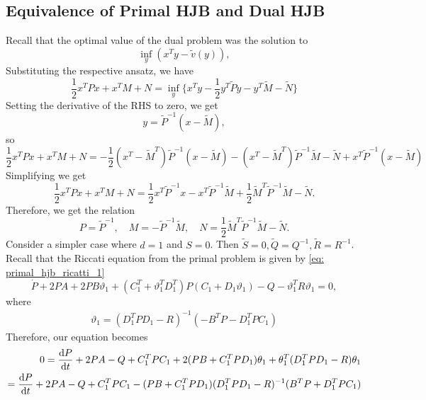 \subsection{Equivalence of Primal HJB and Dual HJB}
Recall that the optimal value of the dual problem was the solution to 
\begin{equation*}
    \inf_y (x^T y - \tilde{v}(y)),
\end{equation*}
Substituting the respective ansatz, we have
\begin{equation*}
    \frac12 x^T P x + x^T M + N = \inf_y \bigg\{ x^T y - \frac12 y^T \tilde{P} y - y^T \tilde{M} - \tilde{N}  \bigg\}
\end{equation*}
Setting the derivative of the RHS to zero, we get 
\begin{equation*}
    y = \tilde{P}^{-1}(x - \tilde{M}),
\end{equation*}
so
\begin{equation*}
    \frac12 x^T P x + x^T M + N  = - \frac12 (x^T - \tilde{M}^T)\tilde{P}^{-1} (x-\tilde{M}) - (x^T - \tilde{M}^T)\tilde{P}^{-1} \tilde{M} - \tilde{N} + x^T \tilde{P}^{-1}(x - \tilde{M})
\end{equation*}
Simplifying we get
\begin{equation*}
    \frac12 x^T P x + x^T M + N = \frac12 x^T \tilde{P}^{-1}x - x^T \tilde{P}^{-1}\tilde{M} + \frac12 \tilde{M}^T \tilde{P}^{-1} \tilde{M} - \tilde{N}.
\end{equation*}
Therefore, we get the relation
\begin{equation*}
    P = \tilde{P}^{-1}, \quad M = -\tilde{P}^{-1} \tilde{M}, \quad N =  \frac12 \tilde{M}^T \tilde{P}^{-1} \tilde{M} - \tilde{N}.
\end{equation*}
Consider a simpler case where $d=1$ and $S = 0$. Then $\tilde{S}=0, \tilde{Q}= Q^{-1}, \tilde{R} = R^{-1}$. Recall that the Riccati equation from the primal problem is given by \eqref{eq: primal_hjb_ricatti_1}
\begin{equation*}
     \dot{P}  +  2P A + 2P B \vartheta_1 + (C_1^T + \vartheta_1^T D_1^T)P(C_1 + D_1 \vartheta_1) 
     -  Q -  \vartheta_1^T R \vartheta_1 = 0,
\end{equation*}
where 
\begin{align*}
    \vartheta_1 = ( D_1^T  P D_1 - R)^{-1} ( - B^T  P - D_1^T  P C_1 )
\end{align*}
Therefore, our equation becomes
\begin{align*}
    0 = \frac{\mathrm{d} P}{\mathrm{d} t} + 2 PA - Q + C_1^T P C_1 + 2 (P B + C_1^T P D_1) \theta_1 + \theta_1^T (D_1^T P D_1 - R)\theta_1\\
    = \frac{\mathrm{d} P}{\mathrm{d} t} + 2 PA - Q + C_1^T P C_1 - (P B + C_1^T P D_1) ( D_1^T  P D_1 - R)^{-1} (B^T  P + D_1^T  P C_1 )
\end{align*}
